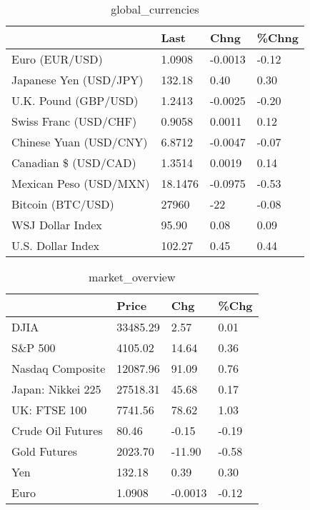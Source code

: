 \documentclass{article}%
\begin{document}
%


\begin{table}[htbp]%
\caption{global\_currencies}%
\centering%
\begin{adjustbox}{width=1\textwidth}%
\begin{tabular}{llll}
\toprule
                       &    Last &    Chng & \%Chng \\
\midrule
        Euro (EUR/USD) &  1.0908 & -0.0013 & -0.12 \\
Japanese Yen (USD/JPY) &  132.18 &    0.40 &  0.30 \\
  U.K. Pound (GBP/USD) &  1.2413 & -0.0025 & -0.20 \\
 Swiss Franc (USD/CHF) &  0.9058 &  0.0011 &  0.12 \\
Chinese Yuan (USD/CNY) &  6.8712 & -0.0047 & -0.07 \\
  Canadian \$ (USD/CAD) &  1.3514 &  0.0019 &  0.14 \\
Mexican Peso (USD/MXN) & 18.1476 & -0.0975 & -0.53 \\
     Bitcoin (BTC/USD) &   27960 &     -22 & -0.08 \\
      WSJ Dollar Index &   95.90 &    0.08 &  0.09 \\
     U.S. Dollar Index &  102.27 &    0.45 &  0.44 \\
\bottomrule
\end{tabular}
%
\end{adjustbox}%
\end{table}

%


\begin{table}[htbp]%
\caption{market\_overview}%
\centering%
\begin{adjustbox}{width=1\textwidth}%
\begin{tabular}{llll}
\toprule
                  &    Price &     Chg &  \%Chg \\
\midrule
             DJIA & 33485.29 &    2.57 &  0.01 \\
          S\&P 500 &  4105.02 &   14.64 &  0.36 \\
 Nasdaq Composite & 12087.96 &   91.09 &  0.76 \\
Japan: Nikkei 225 & 27518.31 &   45.68 &  0.17 \\
     UK: FTSE 100 &  7741.56 &   78.62 &  1.03 \\
Crude Oil Futures &    80.46 &   -0.15 & -0.19 \\
     Gold Futures &  2023.70 &  -11.90 & -0.58 \\
              Yen &   132.18 &    0.39 &  0.30 \\
             Euro &   1.0908 & -0.0013 & -0.12 \\
\bottomrule
\end{tabular}
%
\end{adjustbox}%
\end{table}

%
\end{document}
